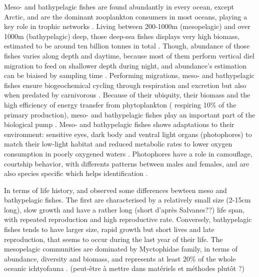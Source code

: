 Meso- and bathypelagic fishes are found abundantly in every ocean, except Arctic, and are the dominant zooplankton consumers in most oceans, playing a key role in trophic networks \citep{davison2015,salvanes2009}. Living between 200-1000m (mesopelagic) and over 1000m (bathypelagic) deep, those deep-sea fishes displays very high biomass, estimated to be around ten billion tonnes in total \citep{garcia2021,gjoesaeter1980,richards2019}. Though, abundance of those fishes varies along depth and daytime, because most of them perform vertical diel migration to feed on shallower depth during night, and abundance's estimation can be biaised by sampling time \citep{catul2011,gaskett2001,garcia2021,pusch2004,salvanes2009}. Performing migrations, meso- and bathypelagic fishes ensure biogeochemical cycling through respiration and excretion but also when predated by carnivorous \citep{garcia2021,spitz2019}. Because of their ubiquity, their biomass and the high efficiency of energy transfer from phytoplankton ( respiring 10\% of the primary production),  meso- and bathypelagic fishes play an important part of the biological pump \citep{garcia2021,spitz2019}.
Meso- and bathypelagic fishes shows adaptations to their environment: sensitive eyes, dark body and ventral light organs (photophores) to match their low-light habitat and reduced metabolic rates to lower oxygen consumption in poorly oxygened waters \citep{salvanes2009}. Photophores have a role in camouflage, courtship behavior, with differents patterns between males and females, and are also species specific which helps identification \citep{paitio2020,salvanes2009}. 

In terms of life history, \citet{childress1980} and \citet{salvanes2009} observed some differences bewteen meso and bathypelagic fishes. The first are characterised by a relatively small size (2-15cm long), slow growth and have a rather long (short d'après Salvanes??) life span, with repeated reproduction and high reproductive rate. Conversely, bathypelagic fishes tends to have larger size, rapid growth but short lives and late reproduction, that seems to occur during the last year of their life. The mesopelagic communities are dominated by Myctophidae family, in terms of abundance, diversity and biomass, and represents at least 20\% of the whole oceanic ichtyofauna \citep{catul2011,kozlov1995,pusch2004}. (peut-être à mettre dans matériels et méthodes plutôt ?)


